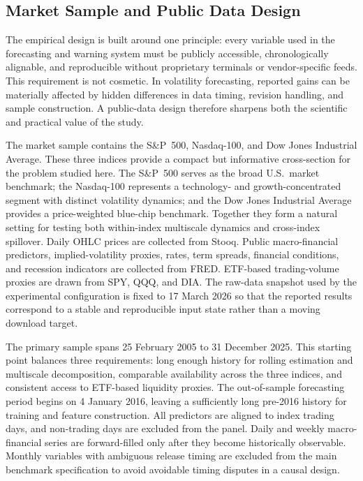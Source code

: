 \subsection{Market Sample and Public Data Design}

The empirical design is built around one principle: every variable used in the forecasting and warning system must be publicly accessible, chronologically alignable, and reproducible without proprietary terminals or vendor-specific feeds. This requirement is not cosmetic. In volatility forecasting, reported gains can be materially affected by hidden differences in data timing, revision handling, and sample construction. A public-data design therefore sharpens both the scientific and practical value of the study.

The market sample contains the S\&P~500, Nasdaq-100, and Dow Jones Industrial Average. These three indices provide a compact but informative cross-section for the problem studied here. The S\&P~500 serves as the broad U.S.\ market benchmark; the Nasdaq-100 represents a technology- and growth-concentrated segment with distinct volatility dynamics; and the Dow Jones Industrial Average provides a price-weighted blue-chip benchmark. Together they form a natural setting for testing both within-index multiscale dynamics and cross-index spillover. Daily OHLC prices are collected from Stooq. Public macro-financial predictors, implied-volatility proxies, rates, term spreads, financial conditions, and recession indicators are collected from FRED. ETF-based trading-volume proxies are drawn from SPY, QQQ, and DIA. The raw-data snapshot used by the experimental configuration is fixed to 17 March 2026 so that the reported results correspond to a stable and reproducible input state rather than a moving download target.



The primary sample spans 25 February 2005 to 31 December 2025. This starting point balances three requirements: long enough history for rolling estimation and multiscale decomposition, comparable availability across the three indices, and consistent access to ETF-based liquidity proxies. The out-of-sample forecasting period begins on 4 January 2016, leaving a sufficiently long pre-2016 history for training and feature construction. All predictors are aligned to index trading days, and non-trading days are excluded from the panel. Daily and weekly macro-financial series are forward-filled only after they become historically observable. Monthly variables with ambiguous release timing are excluded from the main benchmark specification to avoid avoidable timing disputes in a causal design.

